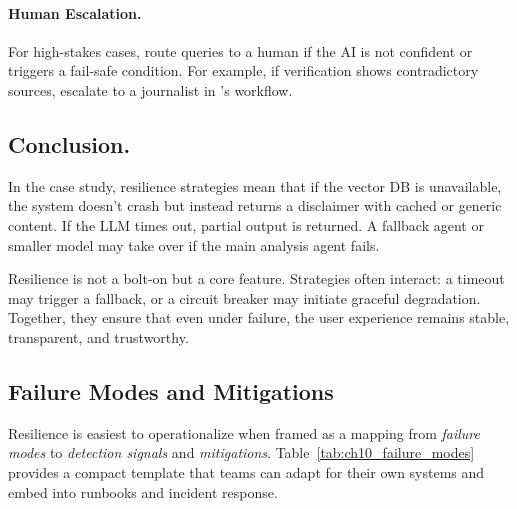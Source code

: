 \paragraph*{Human Escalation.}
For high-stakes cases, route queries to a human if the AI is not confident or triggers a fail-safe condition. For example, if verification shows contradictory sources, escalate to a journalist in \ishtar{}’s workflow.

\subsection*{Conclusion.}
In the \ishtar{} case study, resilience strategies mean that if the vector DB is unavailable, the system doesn’t crash but instead returns a disclaimer with cached or generic content. If the LLM times out, partial output is returned. A fallback agent or smaller model may take over if the main analysis agent fails.  

Resilience is not a bolt-on but a core feature. Strategies often interact: a timeout may trigger a fallback, or a circuit breaker may initiate graceful degradation. Together, they ensure that even under failure, the user experience remains stable, transparent, and trustworthy.


\subsection{Failure Modes and Mitigations}
\label{sec:ch10-failure-modes-mitigations}
Resilience is easiest to operationalize when framed as a mapping from \emph{failure modes} to \emph{detection signals} and \emph{mitigations}.
Table~\ref{tab:ch10_failure_modes} provides a compact template that teams can adapt for their own systems and embed into runbooks and incident response.

